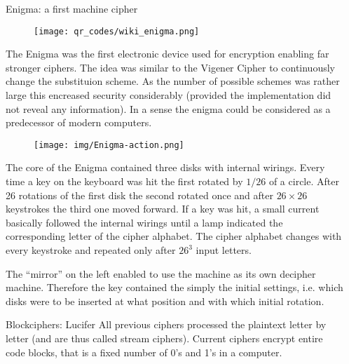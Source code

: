 \documentclass[final,hyperref={pdfpagelabels=false}]{beamer}
\begin{document}
\begin{frame}{}
\begin{columns}[t]
\begin{column}{.3\linewidth}
      \end{column}
      \begin{column}{.3\linewidth}

        \begin{block}{Enigma: a first machine cipher}
        \begin{wrapfigure}{l}{0.1\textwidth}
          \vspace{-20pt}
            \texttt{[image: qr\_codes/wiki\_enigma.png]}
          \vspace{-20pt}
        \end{wrapfigure}
          The Enigma was the first electronic device used for encryption enabling far stronger ciphers. The idea was similar to the Vigener Cipher to continuously change the substituion scheme. As the number of possible schemes was rather large this encreased security considerably (provided the implementation did not reveal any information). In a sense the enigma could be considered as a predecessor of modern computers.
          \begin{figure}
          \center
            \texttt{[image: img/Enigma-action.png]}
          \end{figure}
          The core of the Enigma contained three disks with internal wirings. Every time a key on the keyboard was hit the first rotated by $1/26$ of a circle. After 26 rotations of the first disk the second rotated once and after $26\times 26$ keystrokes the third one moved forward. If a key was hit, a small current basically followed the internal wirings until a lamp indicated the corresponding letter of the cipher alphabet. The cipher alphabet changes with every keystroke and repeated only after $26^3$ input letters. \par The ``mirror'' on the left enabled to use the machine as its own decipher machine. Therefore the key contained the simply the initial settings, i.e. which disks were to be inserted at what position and with which initial rotation. 
        \end{block}

        \begin{block}{Blockciphers: Lucifer}
          All previous ciphers processed the plaintext letter by letter (and are thus called \alert{stream ciphers}). Current ciphers encrypt entire code blocks, that is a fixed number of 0's and 1's in a computer.
        \end{block}
 

\end{column}
\end{columns}
\end{frame}
\end{document}
